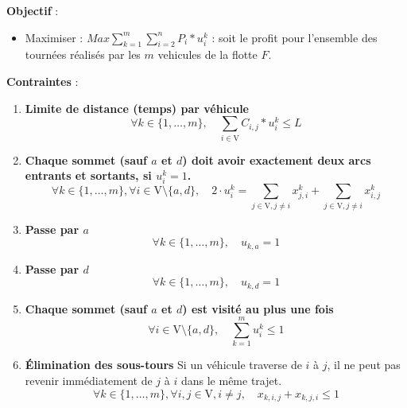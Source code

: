 \documentclass[a4paper, 12pt, DIV=12]{scrartcl}
\begin{document}
\textbf{Objectif} :
\begin{itemize}
    \item Maximiser : $Max\sum_{k=1}^{m} \sum_{i=2}^{n} P_i *u^k_i$ : soit le profit pour l'ensemble des tournées réalisés par les $m$ vehicules de la flotte $F$.
\end{itemize}
\newpage
\textbf{Contraintes} :
\begin{enumerate}
        \item \textbf{Limite de distance (temps) par véhicule}  
        \[
        \forall k \in \{1, \ldots, m\}, \quad \sum_{i \in \text{V}}  C_{i, j} * u_{i}^k \leq L
        \]

        \item \textbf{Chaque sommet (sauf $a$ et $d$) doit avoir exactement deux arcs entrants et sortants, si $u_{i}^k = 1$. }  
        \[
        \forall k \in \{1, \ldots, m\}, \forall i \in \text{V} \setminus \{a, d\}, \quad 
        2 \cdot u_{i}^k = \sum_{j \in \text{V}, j \neq i} x_{j, i}^k+ \sum_{j \in \text{V}, j \neq i} x_{i, j}^k
        \]

        \item \textbf{Passe par $a$}  
        \[
        \forall k \in \{1, \ldots, m\}, \quad u_{k, a} = 1
        \]

        \item \textbf{Passe par $d$}  
        \[
        \forall k \in \{1, \ldots, m\}, \quad u_{k, d} = 1
        \]

        \item \textbf{Chaque sommet (sauf $a$ et $d$) est visité au plus une fois}  
        \[
        \forall i \in \text{V} \setminus \{a, d\}, \quad \sum_{k =1}^m u_{i}^k \leq 1
        \]

        \item \textbf{Élimination des sous-tours}  
        Si un véhicule traverse de $i$ à $j$, il ne peut pas revenir immédiatement de $j$ à $i$ dans le même trajet.  
        \[
        \forall k \in \{1, \ldots, m\}, \forall i, j \in \text{V}, i \neq j, \quad 
        x_{k, i, j} + x_{k, j, i} \leq 1
        \]
    \end{enumerate}
\end{document}
